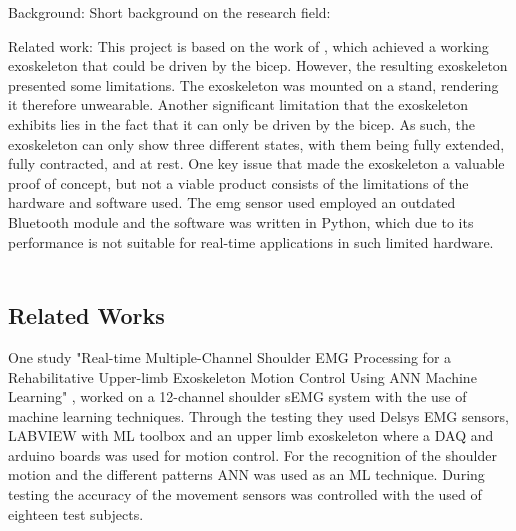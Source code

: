 Background: 
    Short background on the research field:

    Related work: %
        This project is based on the work of \cite{AFES}, which achieved a working exoskeleton that could be driven by the bicep. However, the resulting 
        exoskeleton presented some limitations. The exoskeleton was mounted on a stand, rendering it therefore unwearable. Another significant limitation 
        that the exoskeleton exhibits lies in the fact that it can only be driven by the bicep. As such, the exoskeleton can only show three different states, 
        with them being fully extended, fully contracted, and at rest. One key issue that made the exoskeleton a valuable proof of concept, but not a viable 
        product consists of the limitations of the hardware and software used. The \acs{emg} sensor used employed an outdated Bluetooth module and the software was 
        written in Python, which due to its performance is not suitable for real-time applications in such limited hardware. 
        \\\\
        \subsection{Related Works}
        One study "Real-time Multiple-Channel Shoulder EMG Processing for a Rehabilitative Upper-limb Exoskeleton Motion Control Using ANN Machine Learning" \cite{shoulderexo},
        worked on a 12-channel shoulder sEMG system with the use of machine learning techniques. Through the testing they used Delsys EMG sensors, LABVIEW with ML toolbox and an 
        upper limb exoskeleton where a DAQ and arduino boards was used for motion control. For the recognition of the shoulder motion and the different patterns ANN was used as an 
        ML technique. During testing the accuracy of the movement sensors was controlled with the used of eighteen test subjects.
